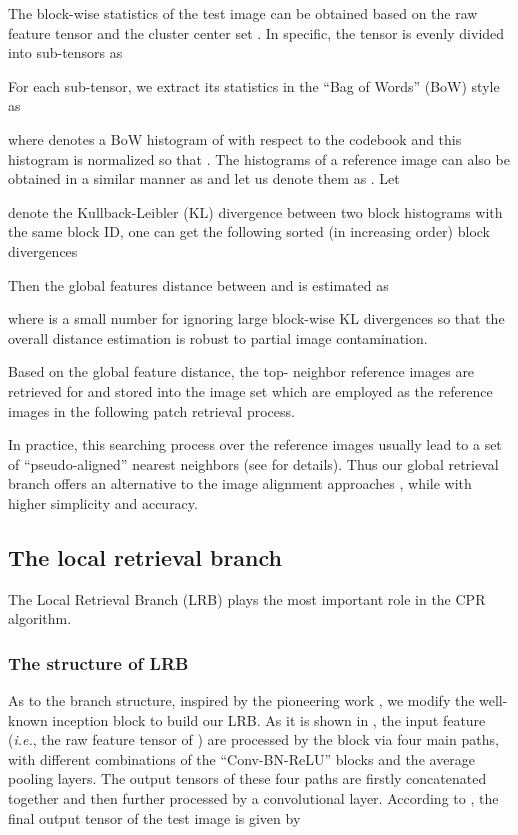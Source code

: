 \documentclass[lettersize,journal]{IEEEtran}
\begin{document}
The block-wise statistics of the test image  can be obtained based
on the raw feature tensor  and the cluster center set
. In specific, the tensor  is evenly
divided into  sub-tensors as

For each sub-tensor, we extract its statistics in the ``Bag of Words'' (BoW) style as

where  denotes a BoW histogram of 
with respect to the codebook  and this histogram is normalized
so that . The histograms
of a reference image  can also be obtained in a similar manner as
 and let us denote them as . Let

denote the Kullback-Leibler (KL) divergence between two block histograms with the same
block ID, one can get the following sorted (in increasing order) block divergences

Then the global features distance between  and  is
estimated as

where  is a small number for ignoring large block-wise KL divergences so that the
overall distance estimation is robust to partial image contamination.

Based on the global feature distance, the top- neighbor reference images are retrieved
for  and stored into the image set  which are employed
as the reference images in the following patch retrieval process.

In practice, this searching process over the reference images usually lead to a set of
``pseudo-aligned'' nearest neighbors (see  for details). Thus our
global retrieval branch offers an alternative to the image alignment approaches
\cite{huang2022registration, zheng2022focus, liu2023diversity}, while with higher
simplicity and accuracy.

\subsection{The local retrieval branch}
The Local Retrieval Branch (LRB) plays the most important role in the CPR algorithm.
\subsubsection{The structure of LRB}
As to the branch structure, inspired by the pioneering work \cite{szegedy2015rethinking},
we modify the well-known inception block to build our LRB. As it is shown in
, the input feature (\emph{i.e.}, the raw feature tensor
 of ) are processed by the block via four main paths, with
different combinations of the ``Conv-BN-ReLU'' blocks and the average pooling layers.  The
output tensors of these four paths are firstly concatenated together and then further
processed by a  convolutional layer. According to ,
the final output tensor of the test image  is given by
\end{document}
